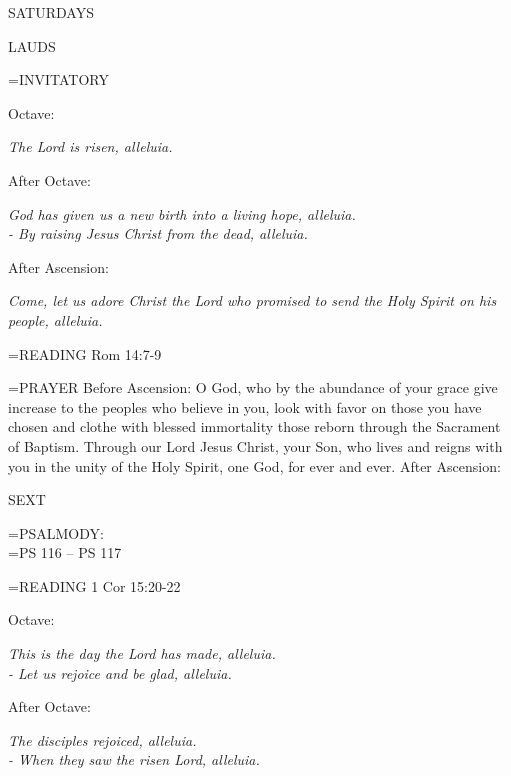 \begin{center}
\normalsize \begin{center}\normalsize SATURDAYS\\
\end{center}
\end{center}

\begin{flushleft}\normalsize LAUDS\\\end{flushleft}

\hangindent=\parindent \small{INVITATORY}
\begin{center}
\end{center}Octave:\begin{center}\textit{	The Lord is risen, alleluia.\\}
\end{center}After Octave:\begin{center}\textit{	God has given us a new birth into a living hope, alleluia.\\}
\textit{- By raising Jesus Christ from the dead, alleluia.\\}
\end{center}After Ascension:\begin{center}\textit{	Come, let us adore Christ the Lord who promised to send the Holy Spirit on his people, alleluia.\\}
\end{center}

\hangindent=\parindent \small{READING}    Rom 14:7-9 \textbf{   \\}

\hangindent=\parindent \small{PRAYER }
Before Ascension:	O God, who by the abundance of your grace give increase to the peoples who believe in you, look with favor on those you have chosen and clothe with blessed immortality those reborn through the Sacrament of Baptism. Through our Lord Jesus Christ, your Son, who lives and reigns with you in the unity of the Holy Spirit, one God, for ever and ever.
After Ascension:	

\begin{flushleft}\normalsize SEXT\\\end{flushleft}

\hangindent=\parindent \small{PSALMODY:}\\
\hangindent=\parindent  PS 116 -- PS 117\vspace{0.5em}

\hangindent=\parindent \small{READING}    1 Cor 15:20-22 \textbf{   }

\begin{center}
\end{center}Octave:\begin{center}\textit{	This is the day the Lord has made, alleluia.\\
- Let us rejoice and be glad, alleluia.}
\end{center}After Octave:\begin{center}\textit{	The disciples rejoiced, alleluia.\\
- When they saw the risen Lord, alleluia.}
\end{center}

